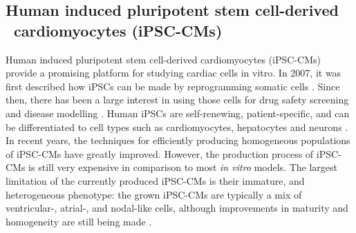 \documentclass{article}
\begin{document}
\subsection{Human induced pluripotent stem cell-derived \ cardiomyocytes (iPSC-CMs)}
Human induced pluripotent stem cell-derived cardiomyocytes (iPSC-CMs) provide a promising platform for studying cardiac cells in vitro. In 2007, it was first described how iPSCs can be made by reprogramming somatic cells \cite{Takahashi2007}. Since then, there has been a large interest in using those cells for drug safety screening and disease modelling \cite{Sallam2016}. Human iPSCs are self-renewing, patient-specific, and can be differentiated to cell types such as cardiomyocytes, hepatocytes and neurons \cite{Rajamohan2013}. In recent years, the techniques for efficiently producing homogeneous populations of iPSC-CMs  have greatly improved. However, the production process of iPSC-CMs is still very expensive in comparison to most \textit{in vitro} models. The largest limitation of the currently produced iPSC-CMs is their immature, and heterogeneous phenotype: the grown iPSC-CMs are typically a mix of ventricular-, atrial-, and nodal-like cells, although improvements in maturity and homogeneity are still being made \cite{Denning2016}. 
%
\end{document}
